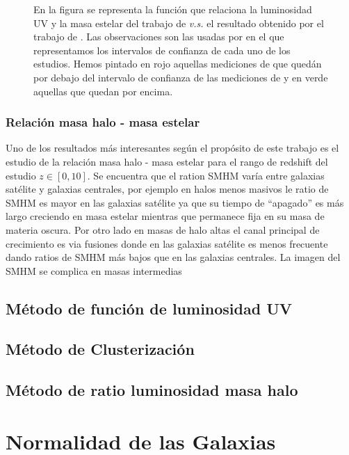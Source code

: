 \begin{figure}[h]
\begin{subfigure}{.5\textwidth}
  		\label{fig:sfig4}
	\end{subfigure}
	\caption{\label{fig:cstm_behroozi_uvsm} En la figura se representa la función que relaciona la luminosidad UV y la masa estelar del trabajo de \cite{finkelstein2015increasing} \textit{v.s.} el resultado obtenido por el trabajo de \cite{behroozi2019universemachine}. Las observaciones son las usadas por \cite{finkelstein2015increasing} en el que representamos los intervalos de confianza de cada uno de los estudios. Hemos pintado en rojo aquellas mediciones de \cite{finkelstein2015increasing} que quedán por debajo del intervalo de confianza de las mediciones de \cite{behroozi2019universemachine} y en verde aquellas que quedan por encima.}
\end{figure}



\subsubsection{Relación masa halo - masa estelar} Uno de los resultados más interesantes según el propósito de este trabajo es el estudio de la relación masa halo - masa estelar para el rango de redshift del estudio $z\in [0,10]$. Se encuentra que el ration SMHM varía entre galaxias satélite y galaxias centrales, por ejemplo en halos menos masivos le ratio de SMHM es mayor en las galaxias satélite ya que su tiempo de ``apagado''  es más largo creciendo en masa estelar mientras que permanece fija en su masa de materia oscura. Por otro lado en masas de halo altas el canal principal de crecimiento es via fusiones donde en las galaxias satélite es menos frecuente dando ratios de SMHM más bajos que en las galaxias centrales. La imagen del SMHM se complica en masas intermedias 

\subsection{Método de función de luminosidad UV}
	
\subsection{Método de Clusterización}

\subsection{Método de ratio luminosidad masa halo}

\section{Normalidad de las Galaxias}

